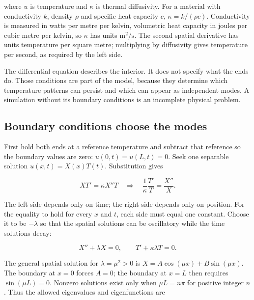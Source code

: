 where \(u\) is temperature and \(\kappa\) is thermal diffusivity. For a material with conductivity \(k\), density \(\rho\) and specific heat capacity \(c\), \(\kappa=k/(\rho c)\). Conductivity is measured in watts per metre per kelvin, volumetric heat capacity in joules per cubic metre per kelvin, so \(\kappa\) has units \(\mathrm{m^2/s}\). The second spatial derivative has units temperature per square metre; multiplying by diffusivity gives temperature per second, as required by the left side.

The differential equation describes the interior. It does not specify what the ends do. Those conditions are part of the model, because they determine which temperature patterns can persist and which can appear as independent modes. A simulation without its boundary conditions is an incomplete physical problem.


\subsection{Boundary conditions choose the modes}\label{04-visual-computing-ii-ch030-boundary-conditions-choose-the-modes}

\hypertarget{04-visual-computing-ii-ch030-boundary-conditions-choose-the-modes}{}

First hold both ends at a reference temperature and subtract that reference so the boundary values are zero: \(u(0,t)=u(L,t)=0\). Seek one separable solution \(u(x,t)=X(x)T(t)\). Substitution gives

\[
XT'=\kappa X''T
\quad\Longrightarrow\quad
\frac{1}{\kappa}\frac{T'}{T}=\frac{X''}{X}.
\]

The left side depends only on time; the right side depends only on position. For the equality to hold for every \(x\) and \(t\), each side must equal one constant. Choose it to be \(-\lambda\) so that the spatial solutions can be oscillatory while the time solutions decay:

\[
X''+\lambda X=0,\qquad T'+\kappa\lambda T=0.
\]

The general spatial solution for \(\lambda=\mu^2>0\) is \(X=A\cos(\mu x)+B\sin(\mu x)\). The boundary at \(x=0\) forces \(A=0\); the boundary at \(x=L\) then requires \(\sin(\mu L)=0\). Nonzero solutions exist only when \(\mu L=n\pi\) for positive integer \(n\). Thus the allowed eigenvalues and eigenfunctions are

